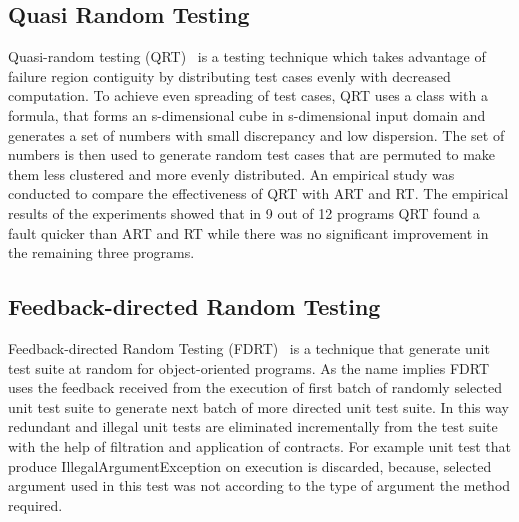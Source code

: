 \subsection{Quasi Random Testing}
Quasi-random testing (QRT)~\cite{Chen2005} is a testing technique which takes advantage of failure region contiguity by distributing test cases evenly with decreased computation. %
To achieve even spreading of test cases, QRT uses a class with a formula, that forms an s-dimensional cube in s-dimensional input domain and generates a set of numbers with small discrepancy and low dispersion. The set of numbers is then used to generate random test cases that are permuted to make them less clustered and more evenly distributed. An empirical study was conducted to compare the effectiveness of QRT with ART and RT. The empirical results of the experiments showed that in 9 out of 12 programs QRT found a fault quicker than ART and RT while there was no significant improvement in the remaining three programs.


\subsection{Feedback-directed Random Testing}
Feedback-directed Random Testing (FDRT)~\cite{Pacheco2007} is a technique that generate unit test suite at random for object-oriented programs. As the name implies FDRT uses the feedback received from the execution of first batch of randomly selected unit test suite to generate next batch of more directed unit test suite. In this way redundant and illegal unit tests are eliminated incrementally from the test suite with the help of filtration and application of contracts. For example unit test that produce IllegalArgumentException on execution is discarded, because, selected argument used in this test was not according to the type of argument the method required. 


